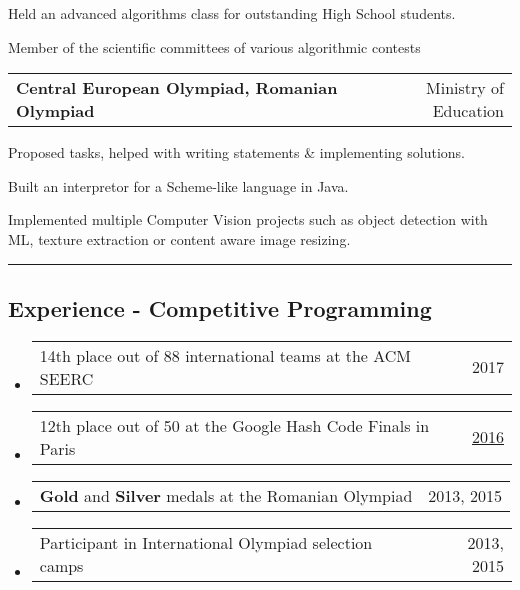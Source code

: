 \documentclass[10pt,letterpaper]{article}
\makeatletter
\newcommand{\headerrow}[2]
{\begin{tabular*}{\linewidth}{l@{\extracolsep{\fill}}r}
	#1 &
	#2 \\
\end{tabular*}}
\makeatother
\begin{document}
\begin{itemize*}

	\item Held an advanced algorithms class for outstanding High School students.

	\item
		{Member of the scientific committees of various algorithmic contests}

	\headerrow
		{\textbf{Central European Olympiad, Romanian Olympiad}}
		{Ministry of Education}

\vspace{-0.6em}

	\begin{itemize*}
		\item Proposed tasks, helped with writing statements \& implementing solutions.
	\end{itemize*}

\vspace{-0.6em}

    \item Built an interpretor for a Scheme-like language in Java.
    \item Implemented multiple Computer Vision projects such as object detection with ML, texture extraction or content aware image resizing.
\end{itemize*}



\hrule

\vspace{-1em}

\subsection*{Experience - Competitive Programming}
\begin{itemize}
	\parskip=0.1em
		\item
		\headerrow
			{14th place out of 88 international teams at the ACM SEERC}
			{2017}

		\item
		\headerrow
			{12th place out of 50 at the Google Hash Code Finals in Paris}
            {\href{https://hashcode.withgoogle.com/hashcode_2016.html}{2016}}

        \item
		\headerrow
            {\textbf{Gold} and \textbf{Silver} medals at the Romanian Olympiad}
			{2013, 2015}

        \item
		\headerrow
            {Participant in International Olympiad selection camps}
			{2013, 2015}

\end{itemize}
\end{document}
